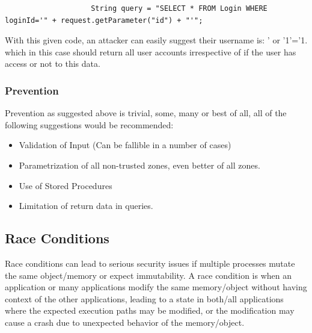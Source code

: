 \documentclass{IEEEtran}
\begin{document}
                \lstset{style=sharpc}
                \begin{lstlisting}
                    String query = "SELECT * FROM Login WHERE loginId='" + request.getParameter("id") + "'";
                \end{lstlisting}

                With this given code, an attacker can easily suggest their username is:
                ' or '1'='1. which in this case should return all user accounts 
                irrespective of if the user has access or not to this data.

            \subsubsection{Prevention}
                Prevention as suggested above is trivial, some, many or best of all, all 
                of the following suggestions would be recommended:
                \begin{itemize}
                    \item Validation of Input (Can be fallible in a number of cases)
                    \item Parametrization of all non-trusted zones, even better of all
                    zones.
                    \item Use of Stored Procedures
                    \item Limitation of return data in queries.
                \end{itemize}

        \subsection{Race Conditions}
            Race conditions can lead to serious security issues if multiple processes mutate the same 
            object/memory or expect immutability. A race condition is when an application or many 
            applications modify the same memory/object without having context of the other applications,
            leading to a state in both/all applications where the expected execution paths may be 
            modified, or the modification may cause a crash due to unexpected behavior of the 
            memory/object. 
\end{document}
